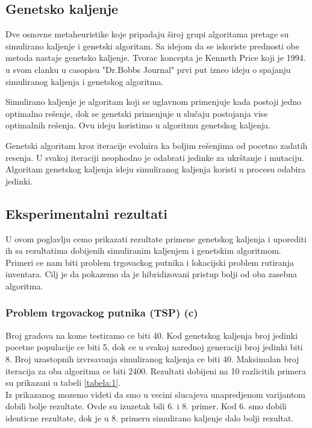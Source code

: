 \documentclass[a4paper]{article}
\begin{document}
\subsection{Genetsko kaljenje}

Dve osnovne metaheuristike koje pripadaju široj grupi algoritama pretage su simulirano kaljenje i genetski algoritam. Sa idejom da se iskoriste prednosti obe metoda nastaje genetsko kaljenje. Tvorac koncepta je Kenneth Price koji je 1994. u svom clanku u casopisu "Dr.Bobbs Journal" prvi put izneo ideju o spajanju simuliranog kaljenja i genetskog algoritma. \par
Simulirano kaljenje je algoritam koji se uglavnom primenjuje kada postoji jedno optimalno rešenje, dok se genetski primenjuje u slučaju postojanja vise optimalnih rešenja. Ovu ideju koristimo u algoritmu genetskog kaljenja. \par
Genetski algoritam kroz iteracije evoluira ka boljim rešenjima od pocetno zadatih resenja. U svakoj iteraciji neophodno je odabrati jedinke za ukrštanje i mutaciju. Algoritam genetskog kaljenja ideju simuliranog kaljenja koristi u procesu odabira jedinki.


\subsection{Eksperimentalni rezultati}

U ovom poglavlju cemo prikazati rezultate primene genetskog kaljenja i uporediti ih sa rezultatima dobijenih simuliranim kaljenjem i genetskim algoritmom. Primeri ce nam biti problem trgovackog putnika i lokacijski problem rutiranja inventara. Cilj je da pokazemo da je hibridizovani pristup bolji od oba zasebna algoritma.   \\ 


\subsubsection{Problem trgovackog putnika (TSP) (c)}

Broj gradova na kome testiramo ce biti 40. Kod genetskog kaljenja broj jedinki pocetne populacije ce biti 5, dok ce u svakoj narednoj generaciji broj jedinki biti 8. Broj uzastopnih izvrsavanja simuliranog kaljenja ce biti 40. Maksimalan broj iteracija za oba algoritma ce biti 2400. Rezultati dobijeni na 10 razlicitih primera su prikazani u tabeli \ref{tabela:1}. \\ 

Iz prikazanog mozemo videti da smo u vecini slucajeva unapredjenom varijantom dobili bolje rezultate. Ovde su izuzetak bili 6. i 8. primer. Kod 6. smo dobili identicne rezultate, dok je u 8. primeru simulirano kaljenje dalo bolji rezultat.
\end{document}
